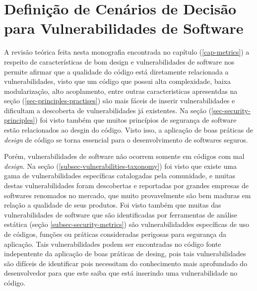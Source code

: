 %



\section{Definição de Cenários de Decisão para Vulnerabilidades de Software}

A revisão teórica feita nesta monografia encontrada no capítulo (\ref{cap-metrics}) a respeito de características de bom design e vulnerabilidades de software nos permite afirmar que a qualidade do código está diretamente relacionada a vulnerabilidades, visto que um código que possui alta complexidade, baixa modularização, alto acoplamento, entre outras caracteristicas apresentdas na seção (\ref{sec-principles-practises}) são mais fáceis de inserir vulnerabilidades e dificultam a descoberta de vulnerabilidades já existentes. Na seção (\ref{sec-security-principles}) foi visto também que muitos princípios de segurança de software estão relacionados ao desgin do código. Visto isso, a aplicação de boas práticas de \emph{design} de código se torna essencial para o desenvolvimento de softwares seguros.

%

Porém, vulnerabilidades de software não ocorrem somente em códigos com mal \emph{design}. Na seção (\ref{subsec-vulnerabilities-taxonomy}) foi visto que existe uma gama de vulnerabilidades específicas catalogadas pela comunidade, e muitas destas vulnerabilidades foram descobertas e reportadas por grandes empresas de softwares renomados no mercado, que muito provavelmente são bem maduras em relação a qualidade de seus produtos. Foi visto também que muitas das vulnerabilidades de software que são identificadas por ferramentas de análise estática (seção \ref{subsec-security-metrics}) são vulnerabilidaddes específicas de uso de códigos, funções ou práticas consideradas perigosas para segurança da aplicação. Tais vulnerabilidades podem ser encontradas no código fonte indepentente da aplicação de boas práticas de desing, pois tais vulnerabilidades são difíceis de identificar pois necessitam do conhecimento mais aprofundado do desenvolvedor para que este saiba que está inserindo uma vulnerabilidade no código.

